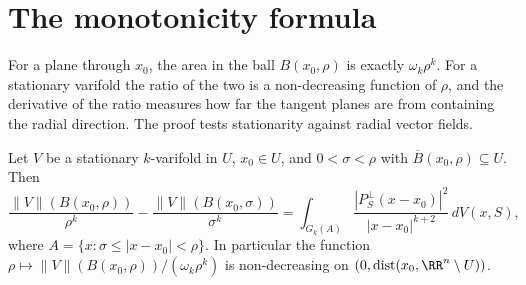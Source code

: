 \section{The monotonicity formula}\label{currents:section-monotonicity}

For a plane through $x_0$, the area in the ball $B(x_0, \rho)$ is exactly $\omega_k\rho^k$. For a stationary varifold the ratio of the two is a non-decreasing function of $\rho$, and the derivative of the ratio
measures how far the tangent planes are from containing the radial direction. The proof tests stationarity against radial vector fields.

\begin{theorem}\label{currents:theorem-monotonicity}
Let $V$ be a stationary $k$-varifold in $U$, $x_0 \in U$, and $0 < \sigma < \rho$ with $\overline{B}(x_0, \rho) \subseteq U$. Then
\[
\frac{\|V\|(B(x_0, \rho))}{\rho^k} - \frac{\|V\|(B(x_0, \sigma))}{\sigma^k} = \int_{G_k(A)}\frac{|P_S^\perp(x - x_0)|^2}{|x - x_0|^{k+2}}\,dV(x, S),
\]
where $A = \{x : \sigma \leq |x - x_0| < \rho\}$.
In particular the function $\rho \mapsto \|V\|(B(x_0, \rho))/(\omega_k\rho^k)$ is non-decreasing on $(0, \operatorname{dist}(x_0, \RR^n \setminus U))$.
\end{theorem}

